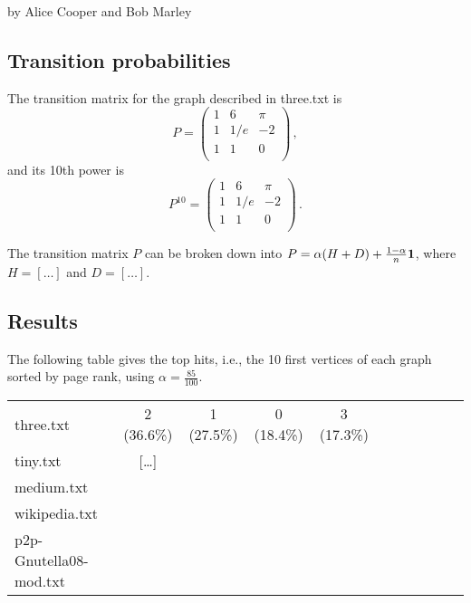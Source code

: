 \documentclass{tufte-handout}
\begin{document}
by Alice Cooper and Bob Marley

\subsection{Transition probabilities}

The transition matrix for the graph described in three.txt
is
\begin{equation*}
P = 
\left(
\begin{array}{ccc}
1 & 6 & \pi \\
1 & 1/e & -2 \\
1 & 1 & 0 \\
\end{array}
\right)\,,
\end{equation*}
and its 10th power is
\begin{equation*}
P^{10} = 
\left(
\begin{array}{ccc}
1 & 6 & \pi \\
1 & 1/e & -2 \\
1 & 1 & 0 \\
\end{array}
\right)\,.
\end{equation*}

The transition matrix $P$ can be broken down into  $P = \alpha(H + D)
+ \frac{1-\alpha}{n} \bf 1$, where $H =[\ldots]$ and $D =[\ldots]$.

\subsection{Results}

The following table gives the top hits, i.e., the 10 first vertices of
each graph sorted by page rank, using $\alpha = \frac{85}{100}$.

\medskip
\begin{fullwidth}
\small
\begin{tabular}{lcccccccccc}
three.txt & 2 (36.6\%) & 1 (27.5\%) & 0 (18.4\%) & 3 (17.3\%) \\
tiny.txt & [\ldots] &\\
medium.txt &\\
wikipedia.txt & \\
p2p-Gnutella08-mod.txt &
\end{tabular}
\end{fullwidth}
\end{document}
